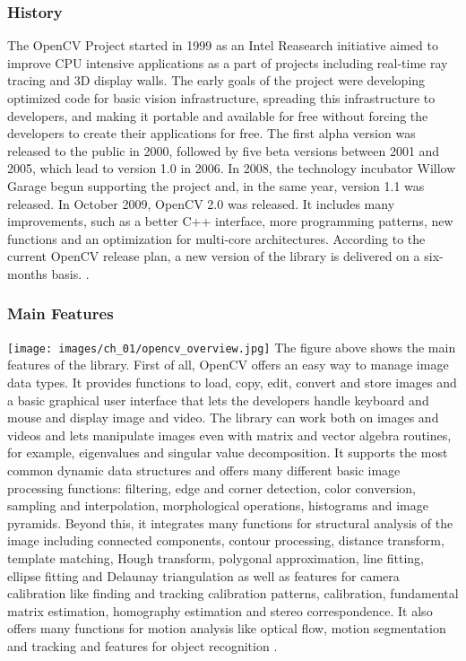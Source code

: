 	\subsubsection*{History}
	The OpenCV Project started in 1999 as an Intel Reasearch initiative aimed to improve CPU intensive applications as a part of projects including real-time ray tracing and 3D display walls. The early goals of the project were developing optimized code for basic vision infrastructure, spreading this infrastructure to developers, and making it portable and available for free without forcing the developers to create their applications for free.
	The first alpha version was released to the public in 2000, followed by five beta versions between 2001 and 2005, which lead to version 1.0 in 2006. In 2008, the technology incubator Willow Garage begun supporting the project and, in the same year, version 1.1  was released. 
	In October 2009, OpenCV 2.0 was released. It includes many improvements, such as a better C++ interface, more programming patterns, new functions and an optimization for multi-core architectures. According to the current OpenCV release plan, a new version of the library is delivered on a six-months basis. \cite{OpenCV:ChangeLogs}.
	
	\subsubsection*{Main Features}
		\texttt{[image: images/ch\_01/opencv\_overview.jpg]}
	The figure above shows the main features of the library. First of all, OpenCV offers an easy way to manage image data types. It provides functions to load, copy, edit, convert and store images and a basic graphical user interface that lets the developers handle keyboard and mouse and display image and video. The library can work both on images and videos and lets manipulate images even with matrix and vector algebra routines, for example, eigenvalues and singular value decomposition. It supports the most common dynamic data structures and offers many different basic image processing functions: filtering, edge and corner detection, color conversion, sampling and interpolation, morphological operations, histograms and image pyramids. Beyond this, it integrates many functions for structural analysis of the image including connected components, contour processing, distance transform, template matching, Hough transform, polygonal approximation, line fitting, ellipse fitting and Delaunay triangulation as well as features for camera calibration like finding and tracking calibration patterns, calibration, fundamental matrix estimation, homography estimation and stereo correspondence. It also offers many functions for motion analysis like optical flow, motion segmentation and tracking and features for object recognition \cite{Agam2006}.
